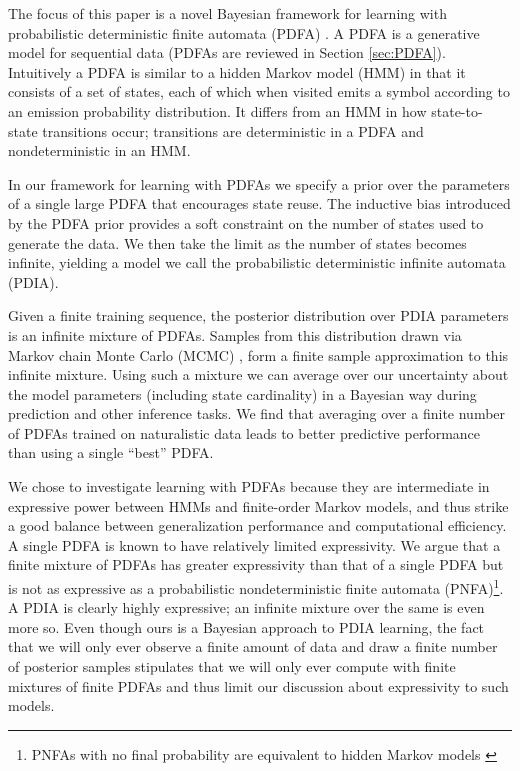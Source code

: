 The focus of this paper is a novel Bayesian framework for learning with probabilistic deterministic finite automata (PDFA) \cite{Rabin1963}.  A PDFA is a generative model for sequential data (PDFAs are reviewed in  Section \ref{sec:PDFA}).  Intuitively a PDFA is similar to a hidden Markov model (HMM) \cite{Rabiner1989} in that it consists of a set of states, each of which when visited emits a symbol according to an emission probability distribution.  It differs from an HMM in how state-to-state transitions occur; transitions are deterministic in a PDFA and nondeterministic in an HMM.  

In our framework for learning with PDFAs we specify a prior over the parameters of a single large PDFA that encourages state reuse.  The inductive bias introduced by the PDFA prior provides a soft constraint on the number of states used to generate the data.  We then take the limit as the number of states becomes infinite, yielding a model we call the probabilistic deterministic infinite automata (PDIA).  

Given a finite training sequence, the posterior distribution over PDIA parameters is an infinite mixture of PDFAs.  Samples from this distribution drawn via Markov chain Monte Carlo (MCMC) \cite{Gelman1995}, form a finite sample approximation to this infinite mixture.  Using such a mixture we can average over our uncertainty about the model parameters (including state cardinality) in a Bayesian way during prediction and other inference tasks.  We find that averaging over a finite number of PDFAs trained on naturalistic data leads to better predictive performance than using a single ``best'' PDFA.  

We chose to investigate learning with PDFAs because they are intermediate in expressive power between HMMs and finite-order Markov models, and thus strike a good balance between generalization performance and computational efficiency.  A single PDFA is known to have relatively limited expressivity.  We argue that a finite mixture of PDFAs has greater expressivity than that of a single PDFA but is not as expressive as a probabilistic nondeterministic finite automata (PNFA)\footnote{PNFAs with no final probability are equivalent to hidden Markov models \cite{Dupont2005} \label{fn:pnfa}}.  A PDIA is clearly highly expressive; an infinite mixture over the same is even more so.  Even though ours is a Bayesian approach to PDIA learning, the fact that we will only ever observe a finite amount of data and draw a finite number of posterior samples stipulates that we will only ever compute with finite mixtures of finite PDFAs and thus limit our discussion about expressivity to such models.   

